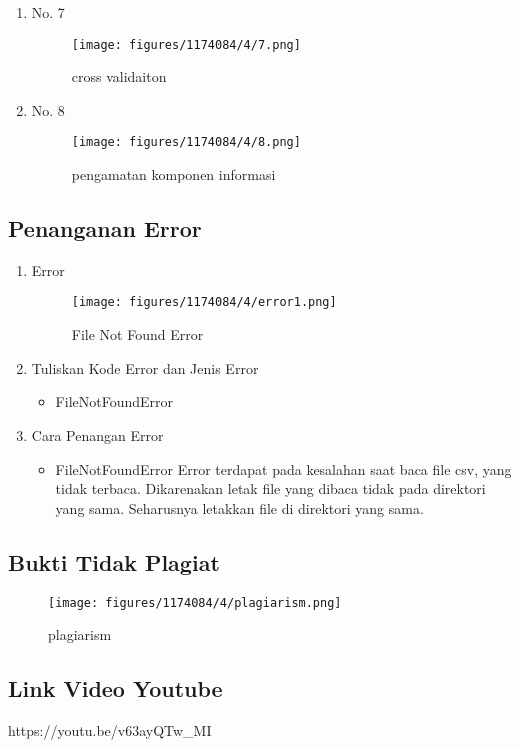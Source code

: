 \begin{enumerate}
\item No. 7
	\hfill\\
	
\begin{figure}[H]
    \texttt{[image: figures/1174084/4/7.png]}
    \centering
    \caption{cross validaiton}
\end{figure}

\item No. 8
	\hfill\\
	
\begin{figure}[H]
    \texttt{[image: figures/1174084/4/8.png]}
    \centering
    \caption{pengamatan komponen informasi}
\end{figure}
\end{enumerate}

\subsection{Penanganan Error}
\begin{enumerate}
\item Error
\begin{figure}[H]
    \texttt{[image: figures/1174084/4/error1.png]}
    \centering
    \caption{File Not Found Error}
\end{figure}
\item Tuliskan Kode Error dan Jenis Error
	\begin{itemize}
		\item FileNotFoundError
	\end{itemize}
	\item Cara Penangan Error
	\begin{itemize}
		\item FileNotFoundError
		\hfill\break
		Error terdapat pada kesalahan saat baca file csv, yang tidak terbaca. Dikarenakan letak file yang dibaca tidak pada direktori yang sama. Seharusnya letakkan file di direktori yang sama. 
	\end{itemize}
\end{enumerate}

\subsection{Bukti Tidak Plagiat}
\begin{figure}[H]
	\texttt{[image: figures/1174084/4/plagiarism.png]}
	\centering
	\caption{plagiarism}
\end{figure}


\subsection{Link Video Youtube}
https://youtu.be/v63ayQTw\_MI
